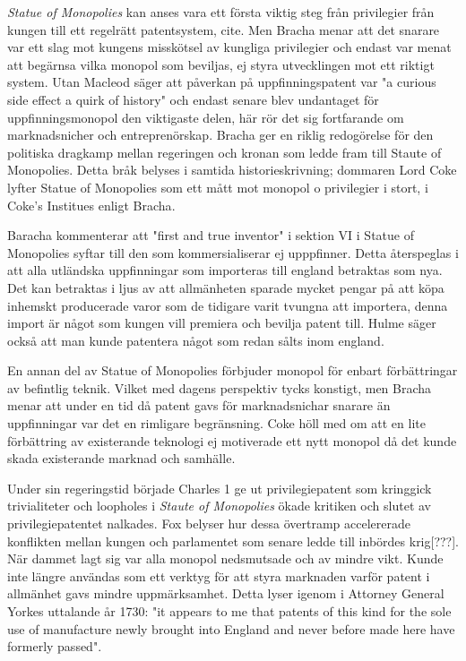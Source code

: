 \emph{Statue of Monopolies} kan anses vara ett första viktig steg från privilegier från kungen till ett
regelrätt patentsystem, cite. Men Bracha\cite{bracha} menar att det snarare var ett slag mot kungens misskötsel av kungliga privilegier
och endast var menat att begärnsa vilka monopol som beviljas, ej styra utvecklingen mot ett riktigt
system. Utan Macleod \cite{macleod2} säger att påverkan på uppfinningspatent  var "a curious side effect a quirk of history" och endast
senare blev undantaget för uppfinningsmonopol den viktigaste delen, här rör det sig fortfarande om marknadsnicher och entreprenörskap. Bracha ger en riklig redogörelse för den politiska dragkamp mellan regeringen och kronan som ledde fram till Staute of Monopolies. Detta bråk belyses i samtida historieskrivning; dommaren Lord Coke lyfter Statue of Monopolies som ett mått mot monopol o privilegier i stort, i Coke's Institues \cite{coke} enligt Bracha\cite{bracha}.

Baracha kommenterar att "first and true inventor" i sektion VI i Statue of Monopolies syftar till den som kommersialiserar ej upppfinner. Detta återspeglas i att alla utländska uppfinningar som importeras till england betraktas som nya\cite{bracha}. Det kan betraktas i ljus av att allmänheten sparade mycket pengar på att köpa inhemskt producerade varor som de tidigare varit tvungna att importera, denna import är något som kungen vill premiera och bevilja patent till. Hulme\cite{hulme2} säger också att man kunde patentera något som redan sålts inom england.  

En annan del av Statue of Monopolies förbjuder monopol för enbart förbättringar av befintlig teknik. Vilket med dagens perspektiv tycks konstigt, men Bracha\cite{bracha} menar att under en tid då patent gavs för marknadsnichar snarare än uppfinningar var det en rimligare begränsning.
Coke höll med om att en lite förbättring av existerande teknologi ej motiverade ett nytt monopol då det kunde skada existerande marknad och samhälle\cite{bracha}.

Under sin regeringstid började Charles 1 ge ut privilegiepatent som kringgick trivialiteter och loopholes i \emph{Staute of
Monopolies} ökade kritiken och slutet av privilegiepatentet nalkades\cite{bracha}. Fox \cite{Fox} belyser hur dessa övertramp accelererade
konflikten mellan kungen och parlamentet som senare ledde till inbördes krig[???]. När dammet lagt sig
var alla monopol nedsmutsade och av mindre vikt. Kunde inte längre användas som ett verktyg för att styra
marknaden varför patent i allmänhet gavs mindre uppmärksamhet. Detta lyser igenom i Attorney General Yorkes uttalande år 1730: "it appears to me that patents of this kind for the sole use of manufacture newly brought into England and never before made here have formerly passed"\cite{macleod2}. 

